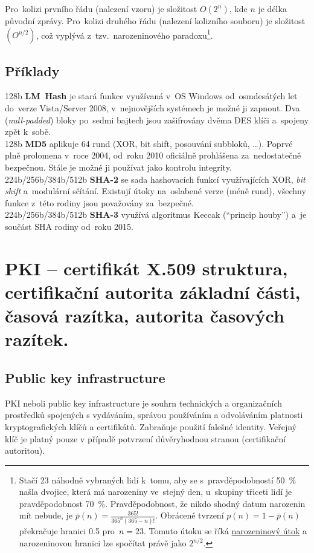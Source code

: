 Pro~kolizi prvního řádu (nalezení vzoru) je složitost $O(2^n)$, kde $n$ je délka původní zprávy. Pro~kolizi druhého řádu (nalezení kolizního souboru) je složitost $(O^{n/2})$, což vyplývá z~tzv.~narozeninového paradoxu\footnote{
Stačí 23 náhodně vybraných lidí k~tomu, aby se s~pravděpodobností 50~\% našla dvojice, která má narozeniny ve~stejný den, u~skupiny třiceti lidí je pravděpodobnost 70~\%. Pravděpodobnost, že nikdo shodný datum narozenin mít nebude, je $\bar{p}(n) = \frac{365!}{365^n(365 - n)!}$. Obrácené tvrzení $p(n) = 1 - \bar{p}(n)$ překračuje hranici 0.5 pro~$n=23$.
Tomuto útoku se říká \href{https://en.wikipedia.org/wiki/Birthday_attack}{narozeninový útok} a narozeninovou hranici lze spočítat právě jako $2^{n/2}$.
}.

\subsection{Příklady}

128b \textbf{LM~Hash} je stará funkce využívaná v~OS Windows od~osmdesátých let do~verze Vista/Server 2008, v~nejnovějších systémech je možné ji zapnout. Dva (\emph{null-padded}) bloky po~sedmi bajtech jsou zašifrovány dvěma DES klíči a~spojeny zpět k~sobě. \\
128b \textbf{MD5} aplikuje 64 rund (XOR, bit shift, posouvání subbloků, \dots). Poprvé plně prolomena v~roce 2004, od~roku 2010 oficiálně prohlášena za~nedostatečně bezpečnou. Stále je možné ji používat jako kontrolu integrity. \\
224b/256b/384b/512b \textbf{SHA-2} se sada hashovacích funkcí využívajících XOR, \emph{bit shift} a~modulární sčítání. Existují útoky na~oslabené verze (méně rund), všechny funkce z~této rodiny jsou považovány za~bezpečné. \\
224b/256b/384b/512b \textbf{SHA-3} využívá algoritmus Keccak (\enquote{princip houby}) a~je součást SHA rodiny od~roku 2015.

\clearpage
\section{PKI -- certifikát X.509 struktura, certifikační autorita základní části, časová razítka, autorita časových razítek.}

\subsection{Public key infrastructure}
PKI neboli public key infrastructure je souhrn technických a organizačních prostředků spojených s vydáváním, správou používáním a odvoláváním platnosti kryptografických klíčů a certifikátů. Zabraňuje použití falešné identity. Veřejný klíč je platný pouze v případě potvrzení důvěryhodnou stranou (certifikační autoritou).


